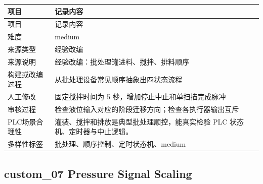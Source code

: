 \begin{longtable}{L{3.0cm}L{10.3cm}}

\toprule

项目 & 记录内容\\

\midrule

\endfirsthead

\toprule

项目 & 记录内容\\

\midrule

\endhead

难度 & medium\\

来源类型 & 经验改编\\

来源说明 & 经验改编：批处理罐进料、搅拌、排料顺序\\

构建或改编过程 & 从批处理设备常见顺序抽象出四状态流程\\

人工修改 & 固定搅拌时间为 5 秒，增加停止中止和单扫描完成脉冲\\

审核过程 & 检查液位输入对应的阶段迁移方向；检查各执行器输出互斥\\

PLC场景合理性 & 灌装、搅拌和排放是典型批处理顺控，能真实检验 PLC 状态机、定时器与中止逻辑。\\

多样性标签 & 批处理、顺序控制、定时状态机、medium\\

\bottomrule

\end{longtable}

\subsection{{\ttfamily custom\_07} Pressure Signal Scaling}

